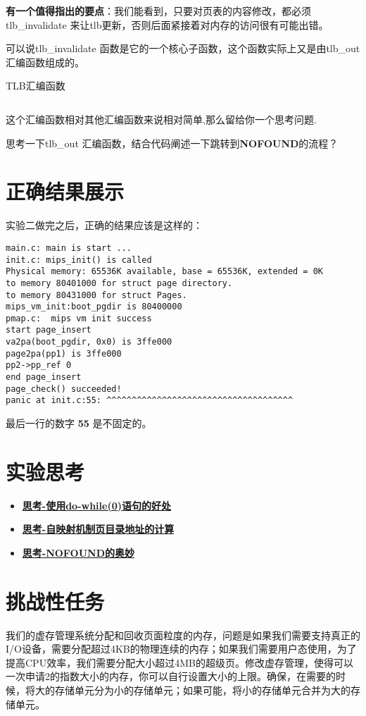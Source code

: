 \textbf{有一个值得指出的要点}：我们能看到，只要对页表的内容修改，都必须tlb\_invalidate 来让tlb更新，否则后面紧接着对内存的访问很有可能出错。

可以说tlb\_invalidate 函数是它的一个核心子函数，这个函数实际上又是由tlb\_out 汇编函数组成的。

\begin{codeBoxWithCaption}{TLB汇编函数\label{code:tlb_out.S}}
  \inputminted[linenos]{gas}{codes/tlb_out.S}
\end{codeBoxWithCaption}

这个汇编函数相对其他汇编函数来说相对简单,那么留给你一个思考问题.

\begin{thinking}\label{think-tlb}
思考一下tlb\_out 汇编函数，结合代码阐述一下跳转到\textbf{NOFOUND}的流程？
\end{thinking}

\section{正确结果展示}

实验二做完之后，正确的结果应该是这样的：

\begin{verbatim}
main.c: main is start ...
init.c: mips_init() is called
Physical memory: 65536K available, base = 65536K, extended = 0K
to memory 80401000 for struct page directory.
to memory 80431000 for struct Pages.
mips_vm_init:boot_pgdir is 80400000
pmap.c:  mips vm init success
start page_insert
va2pa(boot_pgdir, 0x0) is 3ffe000
page2pa(pp1) is 3ffe000
pp2->pp_ref 0
end page_insert
page_check() succeeded!
panic at init.c:55: ^^^^^^^^^^^^^^^^^^^^^^^^^^^^^^^^^^^^^
\end{verbatim}

最后一行的数字 \textbf{55} 是不固定的。

\section{实验思考}

\begin{itemize}
\item \hyperref[think-do_while]{\textbf{\textcolor{baseB}{思考-使用do-while(0)语句的好处}}}
\item \hyperref[think-windows_pde_addr]{\textbf{\textcolor{baseB}{思考-自映射机制页目录地址的计算}}}
\item \hyperref[think-tlb]{\textbf{\textcolor{baseB}{思考-NOFOUND的奥妙}}}
\end{itemize}

\section{挑战性任务}

我们的虚存管理系统分配和回收页面粒度的内存，问题是如果我们需要支持真正的I/O设备，需要分配超过4KB的物理连续的内存；如果我们需要用户态使用，为了提高CPU效率，我们需要分配大小超过4MB的超级页。修改虚存管理，使得可以一次申请2的指数大小的内存，你可以自行设置大小的上限。确保，在需要的时候，将大的存储单元分为小的存储单元；如果可能，将小的存储单元合并为大的存储单元。



